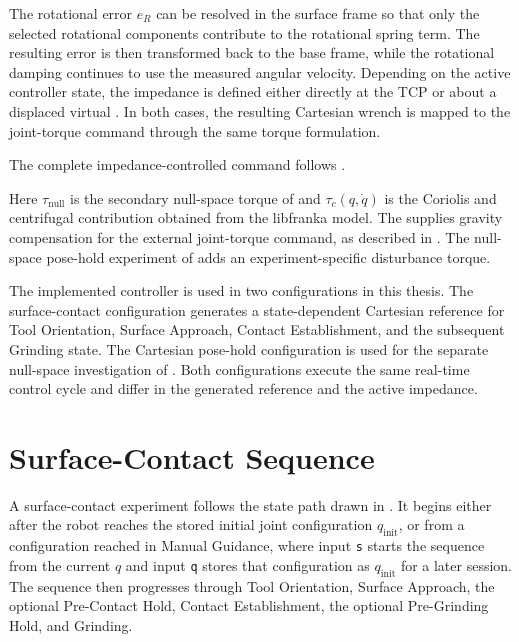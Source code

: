 The rotational error \mbox{\(e_R\)} can be resolved in the surface frame so
that only the selected rotational components contribute to the rotational
spring term. The resulting error is then transformed back to the base frame,
while the rotational damping continues to use the measured angular velocity.
Depending on the active controller state, the impedance is defined either
directly at the TCP or about a displaced virtual . In both cases, the
resulting Cartesian wrench is mapped to the joint-torque command through the
same torque formulation.

The complete impedance-controlled command follows
\mbox{}.

Here \mbox{\(\tau_{\mathrm{null}}\)} is the secondary null-space torque of
\mbox{} and
\mbox{\(\tau_c(q,\dot q)\)} is the Coriolis and centrifugal contribution
obtained from the libfranka model. The \mbox{} supplies gravity
compensation for the external joint-torque command, as described in
\mbox{}. The null-space pose-hold
experiment of \mbox{} adds an
experiment-specific disturbance torque.

The implemented controller is used in two configurations in this thesis. The
surface-contact configuration generates a state-dependent Cartesian reference
for Tool Orientation, Surface Approach, Contact Establishment, and the
subsequent Grinding state. The Cartesian pose-hold configuration is used for
the separate null-space investigation of \mbox{}.
Both configurations execute the same real-time control cycle and differ in the
generated reference and the active impedance.


\section{Surface-Contact Sequence}
\label{sec:implemented_configurations}
\label{subsec:implementation_contact_sequence}
\label{sec:control_phases}

A surface-contact experiment follows the state path drawn in
\mbox{}. It begins either after the robot reaches
the stored initial joint configuration \mbox{\(q_{\mathrm{init}}\)}, or from
a configuration reached in Manual Guidance, where input \texttt{s} starts the
sequence from the current \mbox{\(q\)} and input \texttt{q} stores that
configuration as \mbox{\(q_{\mathrm{init}}\)} for a later session. The
sequence then progresses through Tool Orientation, Surface Approach, the
optional Pre-Contact Hold, Contact Establishment, the optional Pre-Grinding
Hold, and Grinding.

